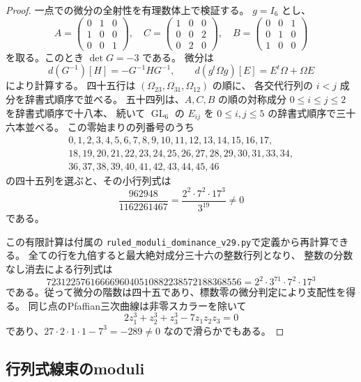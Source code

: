\begin{proof}
一点での微分の全射性を有理数体上で検証する。
$g=I_6$ とし、
\[
 A=\begin{pmatrix}0&1&0\\1&0&0\\0&0&1\end{pmatrix},\quad
 C=\begin{pmatrix}1&0&0\\0&0&2\\0&2&0\end{pmatrix},\quad
 B=\begin{pmatrix}0&0&1\\0&1&0\\1&0&0\end{pmatrix}
\]
を取る。このとき $\det G=-3$ である。
微分は
\[
 d(G^{-1})[H]=-G^{-1}HG^{-1},\qquad
 d(g^t\Omega g)[E]=E^t\Omega+\Omega E
\]
により計算する。
四十五行は $(\Omega_{23},\Omega_{31},\Omega_{12})$ の順に、
各交代行列の $i<j$ 成分を辞書式順序で並べる。
五十四列は、$A,C,B$ の順の対称成分 $0\le i\le j\le2$ を辞書式順序で十八本、
続いて $\operatorname{GL}_6$ の $E_{ij}$ を $0\le i,j\le5$ の辞書式順序で三十六本並べる。
この零始まりの列番号のうち
\[
 \begin{gathered}
 0,1,2,3,4,5,6,7,8,9,10,11,12,13,14,15,16,17,\\
 18,19,20,21,22,23,24,25,26,27,28,29,30,31,33,34,\\
 36,37,38,39,40,41,42,43,44,45,46
 \end{gathered}
\]
の四十五列を選ぶと、その小行列式は
\begin{equation}\label{eq:dominance-minor-v29}
 \frac{962948}{1162261467}
 =\frac{2^2\cdot7^2\cdot17^3}{3^{19}}\ne0
\end{equation}
である。

この有限計算は付属の
\nolinkurl{ruled_moduli_dominance_v29.py}で定義から再計算できる。
全ての行を九倍すると最大絶対成分三十六の整数行列となり、
整数の分数なし消去による行列式は
\[
 7231225761666696040510882238572188368556
 =2^2\cdot3^{71}\cdot7^2\cdot17^3
\]
である。従って微分の階数は四十五であり、標数零の微分判定により支配性を得る。
同じ点のPfaffian三次曲線は非零スカラーを除いて
\[
 2z_1^3+z_2^3+z_3^3-7z_1z_2z_3=0
\]
であり、$27\cdot2\cdot1\cdot1-7^3=-289\ne0$ なので滑らかでもある。
\end{proof}

\subsection{行列式線束のmoduli}


